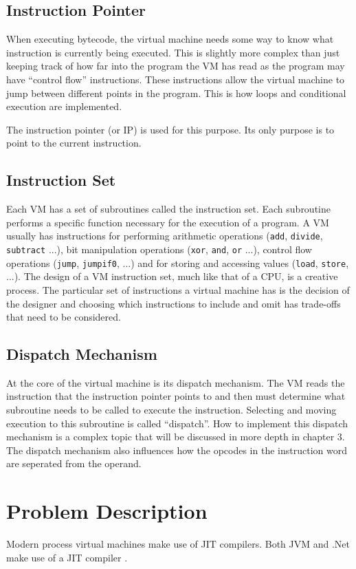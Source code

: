 \documentclass[english,a4paper]{report}
\begin{document}
\subsection{Instruction Pointer}
When executing bytecode, the virtual machine needs some way to know
what instruction is currently being executed. This is slightly more
complex than just keeping track of how far into the program the VM has
read as the program may have ``control flow'' instructions. These
instructions allow the virtual machine to jump between different
points in the program. This is how loops and conditional execution are
implemented.

The instruction pointer (or IP) is used for this purpose. Its only
purpose is to point to the current instruction.

\subsection{Instruction Set}
Each VM has a set of subroutines called the instruction set. Each
subroutine performs a specific function necessary for the execution of
a program. A VM usually has instructions for performing arithmetic
operations (\verb|add|, \verb|divide|, \verb|subtract| ...), bit
manipulation operations (\verb|xor|, \verb|and|, \verb|or| ...),
control flow operations (\verb|jump|, \verb|jumpif0|, ...) and for
storing and accessing values (\verb|load|, \verb|store|, ...). The
design of a VM instruction set, much like that of a CPU, is a creative
process. The particular set of instructions a virtual machine has is
the decision of the designer and choosing which instructions to
include and omit has trade-offs that need to be considered.

\subsection{Dispatch Mechanism} 
At the core of the virtual machine is its dispatch mechanism. The VM
reads the instruction that the instruction pointer points to and then
must determine what subroutine needs to be called to execute the
instruction. Selecting and moving execution to this subroutine is
called ``dispatch''. How to implement this dispatch mechanism is a
complex topic that will be discussed in more depth in chapter 3. The
dispatch mechanism also influences how the opcodes in the instruction
word are seperated from the operand.

\section{Problem Description}
Modern process virtual machines make use of JIT compilers. Both JVM
and .Net make use of a JIT compiler \cite{MSDN,Oracle}. 
\end{document}
